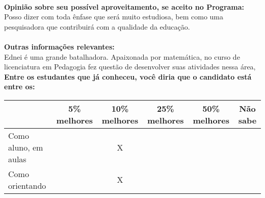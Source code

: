 \documentclass[11pt]{article}
\begin{document}
\\
\textbf{Opinião sobre seu possível aproveitamento, se aceito no Programa:}
\\Posso dizer com toda ênfase que será muito estudiosa, bem como uma pesquisadora que contribuirá com a qualidade da educação.\\ 
\\
\textbf{Outras informações relevantes:} \\Ednei é uma grande batalhadora. Apaixonada por matemática, no curso de licenciatura em Pedagogia fez questão de desenvolver suas atividades nessa área, 
\\[0.3cm]
\textbf{Entre os estudantes que já conheceu, você diria que o candidato está entre os:}
\\
\begin{tabular}{|l|c|c|c|c|c|}
\hline
 & 5\% melhores & 10\% melhores & 25\% melhores & 50\% melhores & Não sabe \\
\hline
Como aluno, em aulas &  & X &  &  & \\
\hline
Como orientando &  & X &  &  & \\
\hline
\end{tabular}
\end{document}
